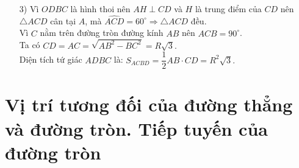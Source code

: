 \begin{bt}
{\begin{enumerate}
\begin{itemize}
				Vì $C$ nằm trên đường tròn đường kính $AB$ nên $\widehat{ACB}=90^\circ\Rightarrow \widehat{ACD}=\widehat{ACB}-\widehat{BCH}=90^\circ - 30^\circ = 60^\circ.$
				\item[3)] Vì $ODBC$ là hình thoi nên $AH\perp CD$ và $H$ là trung điểm của $CD$ nên $\triangle ACD$ cân tại $A$, mà $\widehat{ACD}=60^\circ\Rightarrow \triangle ACD$ đều. \\
				Vì $C$ nằm trên đường tròn đường kính $AB$ nên $\widehat{ACB}=90^\circ$.\\
				Ta có $CD=AC=\sqrt{AB^2-BC^2}=R\sqrt{3}.$\\
				Diện tích tứ giác $ADBC$ là: $S_{ACBD}=\dfrac{1}{2}AB\cdot CD=R^2\sqrt{3}.$
			\end{itemize}
		\end{enumerate}
	}
\end{bt}

\section{Vị trí tương đối của đường thẳng và đường tròn. Tiếp tuyến của đường tròn}

